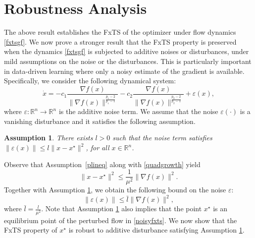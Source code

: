 \documentclass[letterpaper]{article}
\newtheorem{assumption}{Assumption}
\begin{document}


\section{Robustness Analysis} 
The above result establishes the FxTS of the optimizer under flow dynamics \eqref{fxtsgf}. We now prove a stronger result that the FxTS property is preserved when the dynamics \eqref{fxtsgf} is subjected to additive noises or disturbances, under mild assumptions on the noise or the disturbances. This is particularly important in data-driven learning where only a noisy estimate of the gradient is available. Specifically, we consider the following dynamical system:
\begin{equation} \label{noisyfxts}
\dot{x}= -c_1\frac{\nabla f(x)}{\|\nabla f(x)\|^{\frac{p_1-2}{p_1-1}}} -c_2\frac{\nabla f(x)}{\|\nabla f(x)\|^{\frac{p_2-2}{p_2-1}}} + \varepsilon (x),
\end{equation}
where $\varepsilon:\mathbb
R^n\rightarrow\mathbb R^n$ is the additive noise term. We assume that the noise $\varepsilon(\cdot)$ is a vanishing disturbance and it satisfies the following assumption.
\begin{assumption} \label{as:noiseterm}
    There exists $l>0$ such that the noise term satisfies $\|\varepsilon (x)\|\leq l\|x-x^\star\|^2$, for all $x\in\mathbb{R}^n$. 
\end{assumption}

\noindent Observe that Assumption~\ref{plineq} along with \eqref{quadgrowth} yield 
\begin{equation*}
    \|x-x^\star\|^2 \leq \frac{1}{\mu^2}\|\nabla f(x)\|^2.
\end{equation*}
Together with Assumption \ref{as:noiseterm}, we obtain the following bound on the noise $\varepsilon$:
\begin{equation} \label{eq: noisebound2}
\|\varepsilon(x)\| \leq  \bar{l}\|\nabla f(x)\|^2 ,
\end{equation}
where $\bar{l}=\frac{l}{\mu^2}$. Note that Assumption \ref{as:noiseterm} also implies that the point $x^\star$ is an equilibrium point of the perturbed flow in \eqref{noisyfxts}. We now show that the FxTS property of $x^\star$ is robust to additive disturbance satisfying Assumption \ref{as:noiseterm}. 
\end{document}
